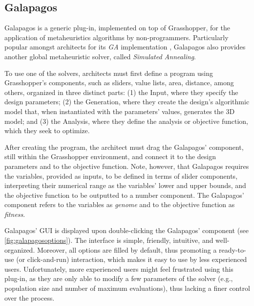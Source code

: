 	
	\subsection{Galapagos}
	\label{subsec:galapagos}
	Galapagos is a generic plug-in, implemented on top of Grasshopper, for the application of metaheuristics algorithms by non-programmers. 
	Particularly popular amongst architects for its \textit{\ac{GA}} implementation \cite{Wortmann2017ADO}, Galapagos also provides another global metaheuristic solver, called \textit{Simulated Annealing}. 
	
	To use one of the solvers, architects must first define a program using Grasshopper's components, such as sliders, value lists, area, distance, among others, organized in three distinct parts: (1) the Input, where they specify the design parameters; (2) the Generation, where they create the design's algorithmic model that, when instantiated with the parameters' values, generates the 3D model; and (3) the Analysis, where they define the analysis or objective function, which they seek to optimize. 
	
	After creating the program, the architect must drag the Galapagos' component, still within the Grasshopper environment, and connect it to the design parameters and to the objective function. Note, however, that Galapagos requires the variables, provided as inputs, to be defined in terms of slider components, interpreting their numerical range as the variables' lower and upper bounds, and the objective function to be outputted to a number component. The Galapagos' component refers to the variables as \textit{genome} and to the objective function as \textit{fitness}.
	
	Galapagos' \ac{GUI} is displayed upon double-clicking the Galapagos' component (see \cref{fig:galapagosoptions}). The interface is simple, friendly, intuitive, and well-organized. Moreover, all options are filled by default, thus promoting a ready-to-use (or click-and-run) interaction, which makes it easy to use by less experienced users. Unfortunately, more experienced users might feel frustrated using this plug-in, as they are only able to modify a few parameters of the solver (e.g., population size and number of maximum evaluations), thus lacking a finer control over the process. 
	

